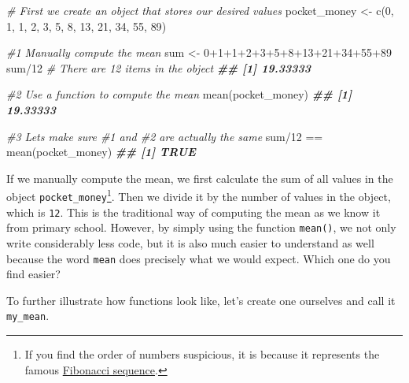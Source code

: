 \documentclass[
]{book}
\newenvironment{Shaded}{\begin{snugshade}}{\end{snugshade}}
\newcommand{\CommentTok}[1]{\textcolor[rgb]{0.56,0.35,0.01}{\textit{#1}}}
\newcommand{\DecValTok}[1]{\textcolor[rgb]{0.00,0.00,0.81}{#1}}
\newcommand{\DocumentationTok}[1]{\textcolor[rgb]{0.56,0.35,0.01}{\textbf{\textit{#1}}}}
\newcommand{\FunctionTok}[1]{\textcolor[rgb]{0.00,0.00,0.00}{#1}}
\newcommand{\NormalTok}[1]{#1}
\newcommand{\OtherTok}[1]{\textcolor[rgb]{0.56,0.35,0.01}{#1}}
\newcommand{\SpecialCharTok}[1]{\textcolor[rgb]{0.00,0.00,0.00}{#1}}
\begin{document}
\begin{Shaded}
\begin{Highlighting}[]
\CommentTok{\# First we create an object that stores our desired values}
\NormalTok{pocket\_money }\OtherTok{\textless{}{-}} \FunctionTok{c}\NormalTok{(}\DecValTok{0}\NormalTok{, }\DecValTok{1}\NormalTok{, }\DecValTok{1}\NormalTok{, }\DecValTok{2}\NormalTok{, }\DecValTok{3}\NormalTok{, }\DecValTok{5}\NormalTok{, }\DecValTok{8}\NormalTok{, }\DecValTok{13}\NormalTok{, }\DecValTok{21}\NormalTok{, }\DecValTok{34}\NormalTok{, }\DecValTok{55}\NormalTok{, }\DecValTok{89}\NormalTok{)}

\CommentTok{\#1 Manually compute the mean}
\NormalTok{sum }\OtherTok{\textless{}{-}} \DecValTok{0}\SpecialCharTok{+}\DecValTok{1}\SpecialCharTok{+}\DecValTok{1}\SpecialCharTok{+}\DecValTok{2}\SpecialCharTok{+}\DecValTok{3}\SpecialCharTok{+}\DecValTok{5}\SpecialCharTok{+}\DecValTok{8}\SpecialCharTok{+}\DecValTok{13}\SpecialCharTok{+}\DecValTok{21}\SpecialCharTok{+}\DecValTok{34}\SpecialCharTok{+}\DecValTok{55}\SpecialCharTok{+}\DecValTok{89}
\NormalTok{sum}\SpecialCharTok{/}\DecValTok{12} \CommentTok{\# There are 12 items in the object}
\DocumentationTok{\#\# [1] 19.33333}

\CommentTok{\#2 Use a function to compute the mean}
\FunctionTok{mean}\NormalTok{(pocket\_money)}
\DocumentationTok{\#\# [1] 19.33333}

\CommentTok{\#3 Let\textquotesingle{}s make sure \#1 and \#2 are actually the same}
\NormalTok{sum}\SpecialCharTok{/}\DecValTok{12} \SpecialCharTok{==} \FunctionTok{mean}\NormalTok{(pocket\_money)}
\DocumentationTok{\#\# [1] TRUE}
\end{Highlighting}
\end{Shaded}

If we manually compute the mean, we first calculate the sum of all values in the object \texttt{pocket\_money}\footnote{If you find the order of numbers suspicious, it is because it represents the famous \href{https://en.wikipedia.org/wiki/Fibonacci_number}{Fibonacci sequence}.}. Then we divide it by the number of values in the object, which is \texttt{12}. This is the traditional way of computing the mean as we know it from primary school. However, by simply using the function \texttt{mean()}, we not only write considerably less code, but it is also much easier to understand as well because the word \texttt{mean} does precisely what we would expect. Which one do you find easier?

To further illustrate how functions look like, let's create one ourselves and call it \texttt{my\_mean}.
\end{document}
